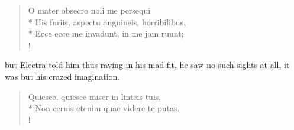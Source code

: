 {\begin{latin}
\begin{verse}%
O mater obsecro noli me persequi\\*
His furiis, aspectu anguineis, horribilibus,\\*
Ecce ecce me invadunt, in me jam ruunt;\\!
\end{verse}%
\end{latin}

but Electra told him thus raving in his mad fit, he saw no such sights
at all, it was but his crazed imagination.

\begin{latin}
\begin{verse}%
Quiesce, quiesce miser in linteis tuis,\\*
Non cernis etenim quae videre te putas.\\!
\end{verse}%
\end{latin}

}
